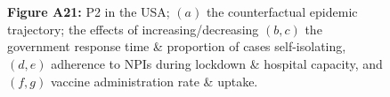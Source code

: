 \documentclass[paper=a4,fontsize=11pt]{article}
\begin{document}
\begin{figure}[!h]
  \\
  \hspace{1.76cm}
  \\
  \caption*{\textbf{Figure A21:} P2 in the USA; $(a)$ the counterfactual epidemic trajectory; the effects of increasing/decreasing $(b,c)$ the government response time \& proportion of cases self-isolating, $(d,e)$ adherence to NPIs during lockdown \& hospital capacity, and $(f,g)$ vaccine administration rate \& uptake.}
\end{figure}
\end{document}
